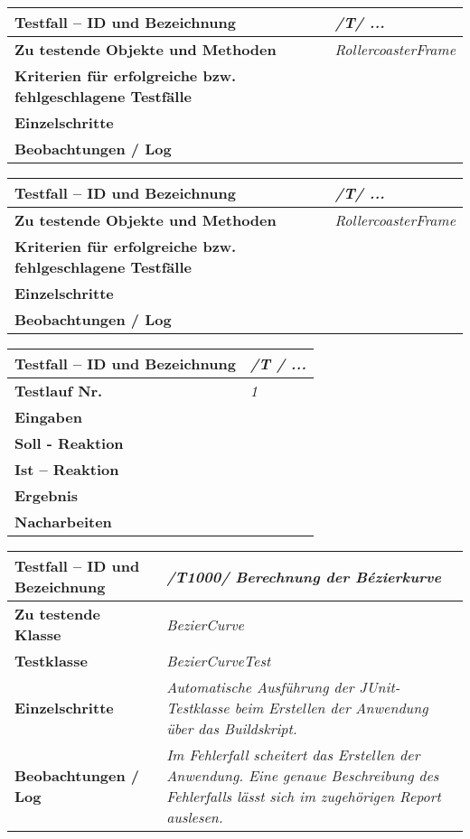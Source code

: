 \begin{longtable}{|p{7cm}|p{10cm}|}
\hline
\textbf{Testfall -- ID und Bezeichnung} &  \textit{/T/ ...} \\
\hline
\textbf{Zu testende Objekte und Methoden} &  \textit{RollercoasterFrame}
\\
\hline
\textbf{Kriterien für erfolgreiche bzw. fehlgeschlagene Testfälle} &
\textit{} \\
\hline
\textbf{Einzelschritte} &  \textit{} \\
\hline
\textbf{Beobachtungen / Log} &  \textit{} \\
\hline
\end{longtable}


\begin{longtable}{|p{7cm}|p{10cm}|}
\hline
\textbf{Testfall -- ID und Bezeichnung} &  \textit{/T/ ...} \\
\hline
\textbf{Zu testende Objekte und Methoden} &  \textit{RollercoasterFrame}
\\
\hline
\textbf{Kriterien für erfolgreiche bzw. fehlgeschlagene Testfälle} &
\textit{} \\
\hline
\textbf{Einzelschritte} &  \textit{} \\
\hline
\textbf{Beobachtungen / Log} &  \textit{} \\
\hline
\end{longtable}

\begin{longtable}{|p{7cm}|p{10cm}|}
\hline
\textbf{Testfall -- ID und Bezeichnung} & \textit{ /T / ...} \\
\hline
\textbf{Testlauf Nr.} & \textit{1} \\
\hline
\textbf{Eingaben} & \textit{} \\
\hline
\textbf{Soll - Reaktion} & \textit{} \\
\hline
\textbf{Ist -- Reaktion} & \textit{} \\
\hline
\textbf{Ergebnis} & \textit{} \\
\hline
\textbf{Nacharbeiten } & \textit{} \\
\hline
\end{longtable}


\begin{longtable}{|p{7cm}|p{10cm}|}
\hline
\textbf{Testfall -- ID und Bezeichnung} &  \textit{/T1000/ Berechnung der Bézierkurve} \\
\hline
\textbf{Zu testende Klasse} &  \textit{BezierCurve} \\
\hline
\textbf{Testklasse} &  \textit{BezierCurveTest} \\
\hline
\textbf{Einzelschritte} &  \textit{Automatische Ausführung der JUnit-Testklasse beim Erstellen
der Anwendung über das Buildskript.} \\
\hline
\textbf{Beobachtungen / Log} &  \textit{Im Fehlerfall scheitert das Erstellen der Anwendung.
Eine genaue Beschreibung des Fehlerfalls lässt sich im zugehörigen Report auslesen.} \\
\hline

\end{longtable}

